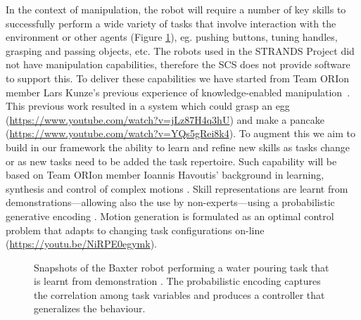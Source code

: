 \documentclass[runningheads,a4paper]{llncs}
\newcommand{\teamori}{Team ORIon}
\begin{document}
In the context of manipulation, the robot will require a number of key skills 
to successfully perform a wide
variety of tasks that involve interaction with the environment or other
agents (Figure \ref{fig:baxter_water_task}), eg. pushing buttons, tuning handles, grasping and passing objects, etc. 
% 
The robots used in the STRANDS Project did not have manipulation capabilities, therefore the SCS does not provide software to support this. To deliver these capabilities we have started from \teamori{} member Lars Kunze's previous experience of knowledge-enabled manipulation~\cite{kunze15aij}. This previous work resulted in a system which could grasp an egg (\url{https://www.youtube.com/watch?v=jLz87H4q3hU}) and make a pancake (\url{https://www.youtube.com/watch?v=YQs5gRei8k4}). 
%
To augment this we aim to build in our framework the ability
to learn and refine new skills as tasks change or as new tasks need to be added
the task repertoire. Such capability will be based on \teamori{} 
member Ioannis Havoutis' background in learning, synthesis and control of 
complex motions \cite{Havoutis16SSRR}. Skill representations
are learnt from demonstrations---allowing also the use by non-experts---using a probabilistic generative encoding %
\cite{Havoutis17ICRA}. Motion generation is formulated as an optimal
control problem that adapts to changing task configurations on-line \cite{Zeestraten17IROS,Zeestraten2017-RAL} (\url{https://youtu.be/NiRPE0egymk}).
\begin{figure}[!t]
	\centering
	\vspace{-10pt}%
	\caption{Snapshots of the Baxter robot performing a water pouring task that
	is learnt from demonstration \cite{Zeestraten2017-RAL}. The probabilistic
	encoding captures the correlation among task variables and produces a
	controller that generalizes the behaviour.}
	\label{fig:baxter_water_task}
	\vspace{-3ex}
\end{figure}
\end{document}
